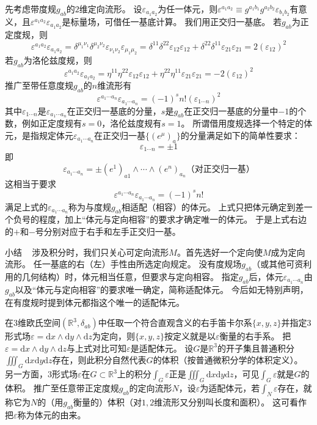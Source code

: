 先考虑带度规$g_{ab}$的$2$维定向流形。
设$\varepsilon_{a_1a_2}$为任一体元，则$\varepsilon^{a_1a_2} \equiv g^{a_1b_1}g^{a_2b_2}\varepsilon_{b_1b_2}$有意义，且$\varepsilon^{a_1a_2}\varepsilon_{a_1a_2}$是标量场，可借任一基底计算。
我们用正交归一基底。
若$g_{ab}$为正定度规，则
$$\varepsilon^{a_1a_2}\varepsilon_{a_1a_2} = \delta^{\mu_1\nu_1}\delta^{\mu_2\nu_2}\varepsilon_{\nu_1\nu_2}\varepsilon_{\mu_1\mu_2} = \delta^{11}\delta^{22}\varepsilon_{12}\varepsilon_{12} + \delta^{22}\delta^{11}\varepsilon_{21}\varepsilon_{21} = 2(\varepsilon_{12})^2$$
若$g_{ab}$为洛伦兹度规，则
$$\varepsilon^{a_1a_2}\varepsilon_{a_1a_2} = \eta^{11}\eta^{22}\varepsilon_{12}\varepsilon_{12} + \eta^{22}\eta^{11}\varepsilon_{21}\varepsilon_{21} = -2(\varepsilon_{12})^2$$
推广至带任意度规$g_{ab}$的$n$维流形有
$$\varepsilon^{a_1 \cdots a_n}\varepsilon_{a_1 \cdots a_n} = (-1)^sn!(\varepsilon_{1 \cdots n})^2$$
其中$\varepsilon_{1 \cdots n}$是$\varepsilon_{a_1 \cdots a_n}$在正交归一基底的分量，$s$是$g_{ab}$在正交归一基底的分量中$-1$的个数，例如正定度规有$s = 0$，洛伦兹度规有$s = 1$。
所谓借用度规选择一个特定的体元，是指规定体元$\varepsilon_{a_1 \cdots a_n}$在正交归一基$\{(e^\mu)_a\}$的分量满足如下的简单性要求：
$$\varepsilon_{1 \cdots n} = \pm 1$$
即
$$\varepsilon_{a_1 \cdots a_n} = \pm(e^1)_{a1} \wedge \cdots \wedge(e^n)_{a_n} \text{（对正交归一基）}$$
这相当于要求
$$\varepsilon^{a_1 \cdots a_n}\varepsilon_{a_1 \cdots a_n} = (-1)^sn!$$
满足上式的$\varepsilon_{a_1 \cdots a_n}$称为与度规$g_{ab}$相适配（相容）的体元。
上式只把体元确定到差一个负号的程度，加上``体元与定向相容''的要求才确定唯一的体元。
于是上式右边的$+$和$-$号分别对应于右手和左手正交归一基。

小结 ~ 涉及积分时，我们只关心可定向流形$M$。首先选好一个定向使$M$成为定向流形。
任一基底的右（左）手性由所选定向规定。
没有度规场$g_{ab}$（或其他可资利用的几何结构）时，体元相当任意，但要求与定向相容。
指定$g_{ab}$后，体元$\varepsilon_{a_1 \cdots a_n}$由$g_{ab}$以及``体元与定向相容''的要求唯一确定，简称适配体元。
今后如无特别声明，在有度规时提到体元都指这个唯一的适配体元。

在$3$维欧氏空间$(\mathbb{R}^3, \delta_{ab})$中任取一个符合直观含义的右手笛卡尔系$\{x, y, z\}$并指定$3$形式场$\varepsilon = \mathrm{d}x \wedge \mathrm{d}y \wedge \mathrm{d}z$为定向，则$\{x, y, z\}$按定义就是以$\varepsilon$衡量的右手系。
把$\varepsilon = \mathrm{d}x \wedge \mathrm{d}y \wedge \mathrm{d}z$与上式对比可知$\varepsilon$是适配体元。
设$G$是$\mathbb{R}^3$的开子集且普通积分$\displaystyle\iiint_G\mathrm{d}x\mathrm{d}y\mathrm{d}z$存在，则此积分自然代表$G$的体积（按普通微积分学的体积定义）。
另一方面，$3$形式场$\varepsilon$在$G \subset \mathbb{R}^3$上的积分$\displaystyle\int_G\varepsilon$正是$\displaystyle\iiint_G\mathrm{d}x\mathrm{d}y\mathrm{d}z$，可见$\displaystyle\int_G\varepsilon$就是$G$的体积。
推广至任意带正定度规$g_{ab}$的定向流形$N$，设$\varepsilon$为适配体元，若$\displaystyle\int_N\varepsilon$存在，就称它为$N$的（用$g_{ab}$衡量的）体积（对$1, 2$维流形又分别叫长度和面积）。
这可看作把$\varepsilon$称为体元的由来。

